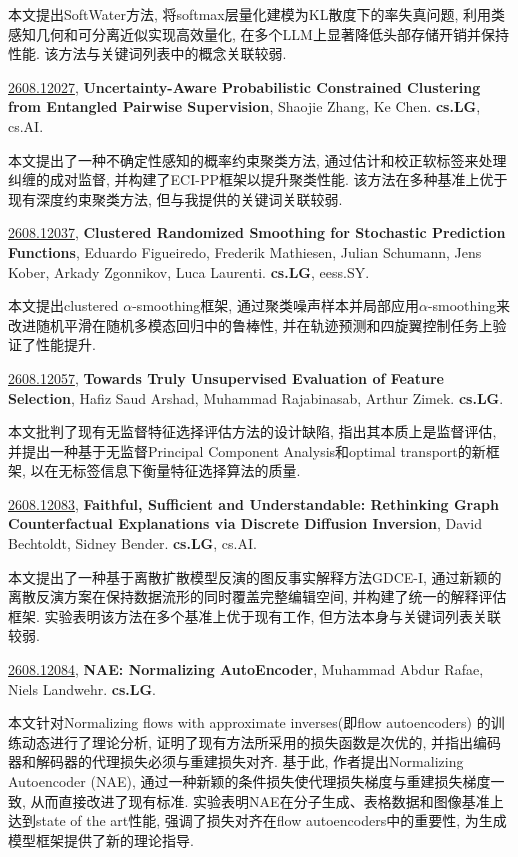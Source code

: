 \documentclass[9pt, a4paper]{article}
\theoremstyle{plain}
\theoremstyle{definition}
\theoremstyle{remark}
\newcommand{\arxivwithtarget}[3]{\hypertarget{#1}{}\href{https://arxiv.org/abs/#1}{#1}, \textbf{\textcolor{arxivblue}{#2}}, #3. }
\begin{document}
本文提出SoftWater方法, 将softmax层量化建模为KL散度下的率失真问题, 利用类感知几何和可分离近似实现高效量化, 在多个LLM上显著降低头部存储开销并保持性能. 该方法与关键词列表中的概念关联较弱.


\arxivwithtarget{2608.12027}{Uncertainty-Aware Probabilistic Constrained Clustering from Entangled Pairwise Supervision}{Shaojie Zhang, Ke Chen}\textbf{cs.LG}, cs.AI.

本文提出了一种不确定性感知的概率约束聚类方法, 通过估计和校正软标签来处理纠缠的成对监督, 并构建了ECI-PP框架以提升聚类性能. 该方法在多种基准上优于现有深度约束聚类方法, 但与我提供的关键词关联较弱.


\arxivwithtarget{2608.12037}{Clustered Randomized Smoothing for Stochastic Prediction Functions}{Eduardo Figueiredo, Frederik Mathiesen, Julian Schumann, Jens Kober, Arkady Zgonnikov, Luca Laurenti}\textbf{cs.LG}, eess.SY.

本文提出clustered $\alpha$-smoothing框架, 通过聚类噪声样本并局部应用$\alpha$-smoothing来改进随机平滑在随机多模态回归中的鲁棒性, 并在轨迹预测和四旋翼控制任务上验证了性能提升.


\arxivwithtarget{2608.12057}{Towards Truly Unsupervised Evaluation of Feature Selection}{Hafiz Saud Arshad, Muhammad Rajabinasab, Arthur Zimek}\textbf{cs.LG}.

本文批判了现有无监督特征选择评估方法的设计缺陷, 指出其本质上是监督评估, 并提出一种基于无监督Principal Component Analysis和optimal transport的新框架, 以在无标签信息下衡量特征选择算法的质量.


\arxivwithtarget{2608.12083}{Faithful, Sufficient and Understandable: Rethinking Graph Counterfactual Explanations via Discrete Diffusion Inversion}{David Bechtoldt, Sidney Bender}\textbf{cs.LG}, cs.AI.

本文提出了一种基于离散扩散模型反演的图反事实解释方法GDCE-I, 通过新颖的离散反演方案在保持数据流形的同时覆盖完整编辑空间, 并构建了统一的解释评估框架. 实验表明该方法在多个基准上优于现有工作, 但方法本身与关键词列表关联较弱.


\arxivwithtarget{2608.12084}{NAE: Normalizing AutoEncoder}{Muhammad Abdur Rafae, Niels Landwehr}\textbf{cs.LG}.

本文针对Normalizing flows with approximate inverses(即flow autoencoders) 的训练动态进行了理论分析, 证明了现有方法所采用的损失函数是次优的, 并指出编码器和解码器的代理损失必须与重建损失对齐. 基于此, 作者提出Normalizing Autoencoder (NAE), 通过一种新颖的条件损失使代理损失梯度与重建损失梯度一致, 从而直接改进了现有标准. 实验表明NAE在分子生成、表格数据和图像基准上达到state of the art性能, 强调了损失对齐在flow autoencoders中的重要性, 为生成模型框架提供了新的理论指导.
\end{document}
